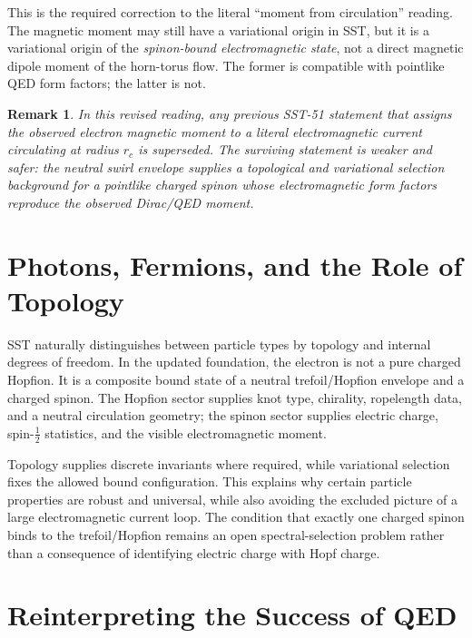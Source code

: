 \documentclass[pdflatex,sn-mathphys-num]{sn-jnl}
\theoremstyle{thmstyleone}
\theoremstyle{thmstyletwo}
\newtheorem{remark}{Remark}
\theoremstyle{thmstylethree}
\newcommand{\rc}{r_c}
\begin{document}
        This is the required correction to the literal ``moment from circulation'' reading. The magnetic moment may still have a variational origin in SST, but it is a variational origin of the \emph{spinon-bound electromagnetic state}, not a direct magnetic dipole moment of the horn-torus flow. The former is compatible with pointlike QED form factors; the latter is not.

        \begin{remark}
            In this revised reading, any previous SST-51 statement that assigns the observed electron magnetic moment to a literal electromagnetic current circulating at radius $\rc$ is superseded. The surviving statement is weaker and safer: the neutral swirl envelope supplies a topological and variational selection background for a pointlike charged spinon whose electromagnetic form factors reproduce the observed Dirac/QED moment.
        \end{remark}

    \section{Photons, Fermions, and the Role of Topology}
        \label{sec:topology}

        SST naturally distinguishes between particle types by topology and internal degrees of freedom. In the updated foundation, the electron is not a pure charged Hopfion. It is a composite bound state of a neutral trefoil/Hopfion envelope and a charged spinon. The Hopfion sector supplies knot type, chirality, ropelength data, and a neutral circulation geometry; the spinon sector supplies electric charge, spin-$\tfrac12$ statistics, and the visible electromagnetic moment.

        Topology supplies discrete invariants where required, while variational selection fixes the allowed bound configuration. This explains why certain particle properties are robust and universal, while also avoiding the excluded picture of a large electromagnetic current loop. The condition that exactly one charged spinon binds to the trefoil/Hopfion remains an open spectral-selection problem rather than a consequence of identifying electric charge with Hopf charge.

    \section{Reinterpreting the Success of QED}
        \label{sec:qed}
\end{document}
